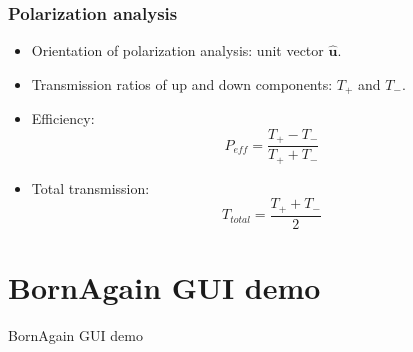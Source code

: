 \documentclass{beamer}
\begin{document}
\begin{frame}
    \frametitle{Polarization analysis}
    \begin{itemize}
        \item Orientation of polarization analysis: unit vector $\mathbf{\hat u}$.
        \item Transmission ratios of up and down components: $T_+$ and $T_-$.
        \item Efficiency:
              \[ P_{eff} = \frac{T_+ - T_-}{T_+ + T_-} \]
        \item Total transmission:
              \[ T_{total} = \frac{T_+ + T_-}{2} \]
    \end{itemize}
\end{frame}

\section{BornAgain GUI demo}

\begin{frame}
    \begin{center}
        \LARGE{BornAgain GUI demo}
    \end{center}
\end{frame}
\end{document}
